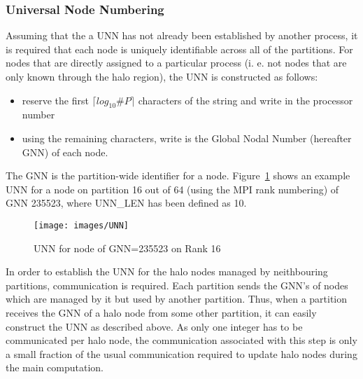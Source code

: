 \documentclass[11pt]{article}
\begin{document}
\subsubsection{Universal Node Numbering}
Assuming that the a UNN has not already been established by another
process, it is required that each node is uniquely identifiable across
all of the partitions. For nodes that are directly assigned to a
particular process (i. e. not nodes that are only known through the
halo region), the UNN is constructed as follows:
\begin{itemize}
\item reserve the first $\lceil log_{10}\#P \rceil$ characters of the string
and write in the processor number
\item using the remaining characters, write is the Global Nodal Number
(hereafter GNN) of each node.
\end{itemize}
The GNN is the partition-wide identifier for a
node. Figure~\ref{fig:UNN} shows an example UNN for a node on
partition 16 out of 64 (using the MPI rank numbering) of GNN 235523,
where UNN\_LEN has been defined as 10.
\begin{figure}[h]\label{fig:UNN}
\centering
\texttt{[image: images/UNN]}
\caption{UNN for node of GNN=235523 on Rank 16}
\end{figure}
In order to establish the UNN for the halo nodes managed by
neithbouring partitions, communication is required. Each partition
sends the GNN's of nodes which are managed by it but used by another
partition. Thus, when a partition receives the GNN of a halo node from
some other partition, it can easily construct the UNN as described
above. As only one integer has to be communicated per halo node, the
communication associated with this step is only a small fraction of
the usual communication required to update halo nodes during the main
computation.
\newpage
\end{document}
